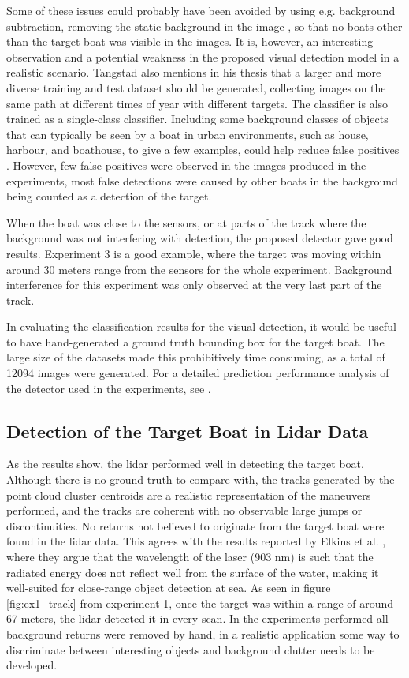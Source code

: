 Some of these issues could probably have been avoided by using e.g. background subtraction, removing the static background in the image \cite{modernCV}, so that no boats other than the target boat was visible in the images. It is, however, an interesting observation and a potential weakness in the proposed visual detection model in a realistic scenario. Tangstad also mentions in his thesis that a larger and more diverse training and test dataset should be generated, collecting images on the same path at different times of year with different targets. The classifier is also trained as a single-class classifier. Including some background classes of objects that can typically be seen by a boat in urban environments, such as house, harbour, and boathouse, to give a few examples, could help reduce false positives \cite{tangstad}. However, few false positives were observed in the images produced in the experiments, most false detections were caused by other boats in the background being counted as a detection of the target.

When the boat was close to the sensors, or at parts of the track where the background was not interfering with detection, the proposed detector gave good results. Experiment 3 is a good example, where the target was moving within around 30 meters range from the sensors for the whole experiment. Background interference for this experiment was only observed at the very last part of the track. 

In evaluating the classification results for the visual detection, it would be useful to have hand-generated a ground truth bounding box for the target boat. The large size of the datasets made this prohibitively time consuming, as a total of 12094 images were generated. For a detailed prediction performance analysis of the detector used in the experiments, see \cite{tangstad}.
\subsection{Detection of the Target Boat in Lidar Data}
As the results show, the lidar performed well in detecting the target boat. Although there is no ground truth to compare with, the tracks generated by the point cloud cluster centroids are a realistic representation of the maneuvers performed, and the tracks are coherent with no observable large jumps or discontinuities. No returns not believed to originate from the target boat were found in the lidar data. This agrees with the results reported by Elkins et al. \cite{ROB:ROB20367}, where they argue that the wavelength of the laser (903 nm) is such that the radiated energy does not reflect well from the surface of the water, making it well-suited for close-range object detection at sea. As seen in figure \ref{fig:ex1_track} from experiment 1, once the target was within a range of around 67 meters, the lidar detected it in every scan. In the experiments performed all background returns were removed by hand, in a realistic application some way to discriminate between interesting objects and background clutter needs to be developed.
